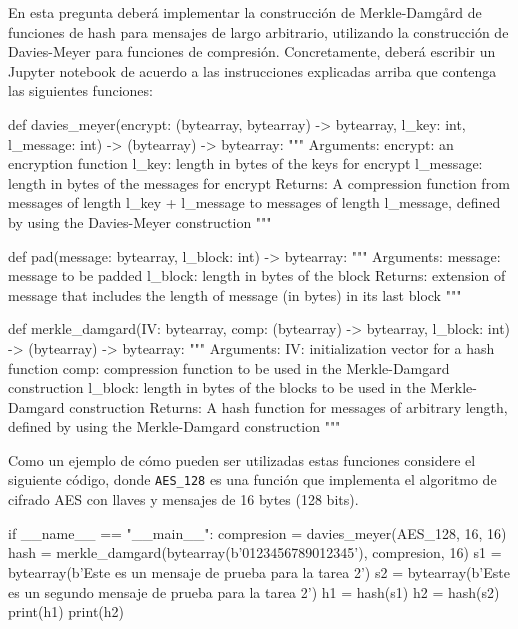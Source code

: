 
En esta pregunta deberá implementar la construcción de Merkle-Damgård
de funciones de hash para mensajes de largo arbitrario, utilizando la
construcción de Davies-Meyer para funciones de
compresión. Concretamente, deberá escribir un Jupyter notebook de
acuerdo a las instrucciones explicadas arriba que contenga las
siguientes funciones:
\begin{python}
def davies_meyer(encrypt: (bytearray, bytearray) -> bytearray,
                 l_key: int, l_message: int) -> (bytearray) -> bytearray:
    """
    Arguments:
      encrypt: an encryption function
      l_key: length in bytes of the keys for encrypt
      l_message: length in bytes of the messages for encrypt
    Returns:
      A compression function from messages of length l_key + l_message to
      messages of length l_message, defined by using the Davies-Meyer
      construction   
    """
\end{python}

\begin{python}
def pad(message: bytearray, l_block: int) -> bytearray:
    """
    Arguments:
      message: message to be padded
      l_block: length in bytes of the block
    Returns:
      extension of message that includes the length of message
      (in bytes) in its last block
    """
\end{python}

\begin{python}
def merkle_damgard(IV: bytearray, comp: (bytearray) -> bytearray,
                   l_block: int) -> (bytearray) -> bytearray:
    """
    Arguments:
      IV: initialization vector for a hash function
      comp: compression function to be used in the Merkle-Damgard
      construction
      l_block: length in bytes of the blocks to be used in the Merkle-Damgard
      construction
    Returns:
      A hash function for messages of arbitrary length, defined by using
      the Merkle-Damgard construction
    """
\end{python}    
Como un ejemplo de cómo pueden ser utilizadas estas funciones
considere el siguiente código, donde \verb+AES_128+ es una función que
implementa el algoritmo de cifrado AES con llaves y mensajes de 16
bytes (128 bits).
\begin{python}
if __name__ == "__main__":
    compresion = davies_meyer(AES_128, 16, 16)
    hash = merkle_damgard(bytearray(b'0123456789012345'), compresion, 16)
    s1 = bytearray(b'Este es un mensaje de prueba para la tarea 2')
    s2 = bytearray(b'Este es un segundo mensaje de prueba para la tarea 2')
    h1 = hash(s1)
    h2 = hash(s2)
    print(h1)
    print(h2)
\end{python}    

